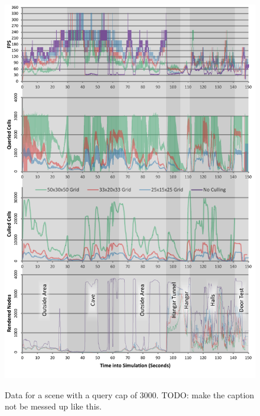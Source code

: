 \documentclass[12pt]{ucthesis}
\newcommand{\captionfonts}{\small\bf\ssp}
\begin{document}
\begin{figure}
\begin{center}
\includegraphics[width=\textwidth]{Images/Graphs/480-3000.pdf}
\label{fig:graph-3000}
\captionfonts
\caption[Query Cap of 3000]{Data for a scene with a query cap of 3000.  TODO: make the caption not be messed up like this.}
\end{center}
\end{figure}
\end{document}
